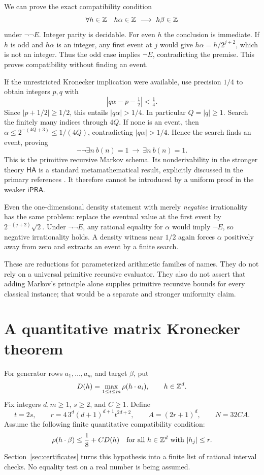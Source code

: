 \documentclass[11pt]{article}
\theoremstyle{definition}\newtheorem{definition}[theorem]{Definition}
\theoremstyle{remark}\newtheorem{remark}[theorem]{Remark}
\newcommand{\ipra}{\mathsf{iPRA}}\newcommand{\HA}{\mathsf{HA}}
\begin{document}
We can prove the exact compatibility condition
\[
 \forall h\in\Z\quad h\alpha\in\Z\ \longrightarrow\ h\beta\in\Z
\]
under $\neg\neg E$. Integer parity is decidable. For even $h$ the conclusion is immediate. If $h$ is odd and $h\alpha$ is an integer, any first event at $j$ would give $h\alpha=h/2^{j+2}$, which is not an integer. Thus the odd case implies $\neg E$, contradicting the premise. This proves compatibility without finding an event.

If the unrestricted Kronecker implication were available, use precision $1/4$ to obtain integers $p,q$ with
\[
 |q\alpha-p-\tfrac12|<\tfrac14.
\]
Since $|p+1/2|\ge1/2$, this entails $|q\alpha|>1/4$. In particular $Q=|q|\ge1$. Search the finitely many indices through $4Q$. If none is an event, then $\alpha\le2^{-(4Q+3)}\le1/(4Q)$, contradicting $|q\alpha|>1/4$. Hence the search finds an event, proving
\[
 \neg\neg\exists n\ b(n)=1\ \longrightarrow\ \exists n\ b(n)=1.
\]
This is the primitive recursive Markov schema. Its nonderivability in the stronger theory $\HA$ is a standard metamathematical result, explicitly discussed in the primary references \cite{herbelin,moschovakis}. It therefore cannot be introduced by a uniform proof in the weaker $\ipra$.

Even the one-dimensional density statement with merely \emph{negative} irrationality has the same problem: replace the eventual value at the first event by $2^{-(j+2)}\sqrt2$. Under $\neg\neg E$, any rational equality for $\alpha$ would imply $\neg E$, so negative irrationality holds. A density witness near $1/2$ again forces $\alpha$ positively away from zero and extracts an event by a finite search.

These are reductions for parameterized arithmetic families of names. They do not rely on a universal primitive recursive evaluator. They also do not assert that adding Markov's principle alone supplies primitive recursive bounds for every classical instance; that would be a separate and stronger uniformity claim.

\section{A quantitative matrix Kronecker theorem}\label{sec:kronecker}

For generator rows $a_1,\ldots,a_m$ and target $\beta$, put
\[
 D(h)=\max_{1\le i\le m}\rho(h\cdot a_i),\qquad h\in\mathbb Z^d.
\]
Fix integers $d,m\ge1$, $s\ge2$, and $C\ge1$. Define
\begin{equation}\label{eq:k-constants}
 t=2s,\qquad
 r=4\,3^d(d+1)^{d+1}t^{2d+2},\qquad
 A=(2r+1)^d,\qquad N=32CA.
\end{equation}
Assume the following finite quantitative compatibility condition:
\begin{equation}\label{eq:k-condition}
 \rho(h\cdot\beta)\le\frac18+C D(h)
 \quad\text{for all }h\in\mathbb Z^d\text{ with }|h_j|\le r.
\end{equation}
Section~\ref{sec:certificates} turns this hypothesis into a finite list of rational interval checks. No equality test on a real number is being assumed.
\end{document}
